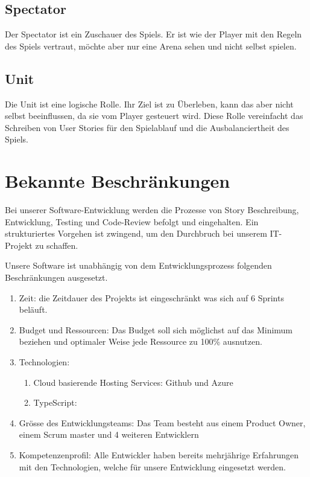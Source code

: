 \documentclass[a4paper, 11pt]{scrartcl}
\let\oldsection\section
\renewcommand\section{\clearpage\oldsection}
\begin{document}
\subsection{Spectator}
Der Spectator ist ein Zuschauer des Spiels. Er ist wie der Player mit den Regeln des Spiels vertraut, möchte aber nur eine Arena sehen und nicht selbst spielen. 
\subsection{Unit}
Die Unit ist eine logische Rolle. Ihr Ziel ist zu Überleben, kann das aber nicht selbst beeinflussen, da sie vom Player gesteuert wird. Diese Rolle vereinfacht das Schreiben von User Stories für den Spielablauf und die Ausbalanciertheit des Spiels. 

\section{Bekannte Beschränkungen}

Bei unserer Software-Entwicklung werden die Prozesse von Story Beschreibung, Entwicklung, Testing und Code-Review befolgt und eingehalten.
Ein strukturiertes Vorgehen ist zwingend, um den Durchbruch bei unserem IT-Projekt zu schaffen.

Unsere Software ist unabhängig von dem Entwicklungsprozess folgenden Beschränkungen ausgesetzt.
\begin{enumerate}
\item Zeit: die Zeitdauer des Projekts ist eingeschränkt was sich auf 6 Sprints beläuft.
\item Budget und Ressourcen: Das Budget soll sich möglichst auf das Minimum beziehen und optimaler Weise jede Ressource zu 100\% ausnutzen.
\item Technologien:
	\begin{enumerate}

	\item Cloud basierende Hosting Services: Github und Azure
	\item TypeScript:

	\end{enumerate}
\item Grösse des Entwicklungsteams: Das Team besteht aus einem Product Owner, einem Scrum master und 4 weiteren Entwicklern
\item Kompetenzenprofil: Alle Entwickler haben bereits mehrjährige Erfahrungen mit den Technologien, welche für unsere Entwicklung eingesetzt werden.
\end{enumerate}
\end{document}
